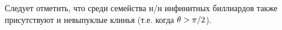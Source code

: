 \documentclass[a4paper]{article}
\begin{document}


Следует отметить, что среди семейства н/н инфинитных биллиардов также присутствуют и невыпуклые клинья (т.е. когда $\theta>\pi/{\rm 2}$).

\end{document}
